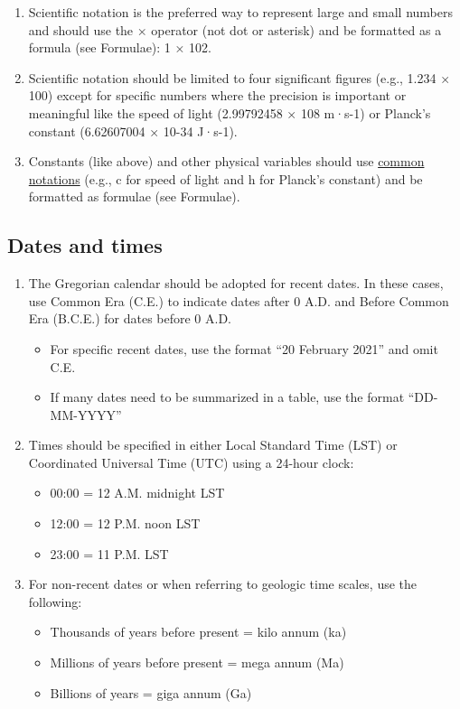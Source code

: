\documentclass[
]{book}
\providecommand{\tightlist}{%
  \setlength{\itemsep}{0pt}\setlength{\parskip}{0pt}}
\begin{document}
\begin{enumerate}
\def\labelenumi{\arabic{enumi}.}
\tightlist
\item
  Scientific notation is the preferred way to represent large and small numbers and should use the × operator (not dot or asterisk) and be formatted as a formula (see Formulae): 1 × 102.
\item
  Scientific notation should be limited to four significant figures (e.g., 1.234 × 100) except for specific numbers where the precision is important or meaningful like the speed of light (2.99792458 × 108 m·s-1) or Planck's constant (6.62607004 × 10-34 J·s-1).
\item
  Constants (like above) and other physical variables should use \href{https://en.wikipedia.org/wiki/List_of_common_physics_notations}{common notations} (e.g., c for speed of light and h for Planck's constant) and be formatted as formulae (see Formulae).
\end{enumerate}

\hypertarget{dates-and-times}{%
\subsection{Dates and times}\label{dates-and-times}}

\begin{enumerate}
\def\labelenumi{\arabic{enumi}.}
\tightlist
\item
  The Gregorian calendar should be adopted for recent dates. In these cases, use Common Era (C.E.) to indicate dates after 0 A.D. and Before Common Era (B.C.E.) for dates before 0 A.D.

  \begin{itemize}
  \tightlist
  \item
    For specific recent dates, use the format ``20 February 2021'' and omit C.E.
  \item
    If many dates need to be summarized in a table, use the format ``DD-MM-YYYY''
  \end{itemize}
\item
  Times should be specified in either Local Standard Time (LST) or Coordinated Universal Time (UTC) using a 24-hour clock:

  \begin{itemize}
  \tightlist
  \item
    00:00 = 12 A.M. midnight LST
  \item
    12:00 = 12 P.M. noon LST
  \item
    23:00 = 11 P.M. LST
  \end{itemize}
\item
  For non-recent dates or when referring to geologic time scales, use the following:

  \begin{itemize}
  \tightlist
  \item
    Thousands of years before present = kilo annum (ka)
  \item
    Millions of years before present = mega annum (Ma)
  \item
    Billions of years = giga annum (Ga)
  \end{itemize}
\end{enumerate}
\end{document}
